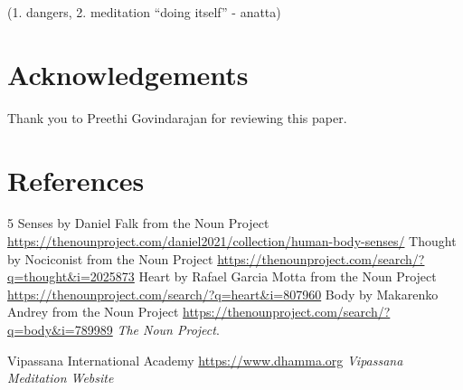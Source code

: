 \documentclass[a4paper, amsfonts, amssymb, amsmath, reprint, showkeys, nofootinbib, twoside]{revtex4-1}
\begin{document}
(1. dangers, 2. meditation ``doing itself'' - anatta)


\section*{Acknowledgements}

Thank you to Preethi Govindarajan for reviewing this paper.


\section*{References}

\begin{thebibliography}{99}

  5 Senses by Daniel Falk from the Noun Project
  \url{https://thenounproject.com/daniel2021/collection/human-body-senses/}
  Thought by Nociconist from the Noun Project
  \url{https://thenounproject.com/search/?q=thought&i=2025873}
  Heart by Rafael Garcia Motta from the Noun Project
  \url{https://thenounproject.com/search/?q=heart&i=807960}
  Body by Makarenko Andrey from the Noun Project
  \url{https://thenounproject.com/search/?q=body&i=789989}
  \textit{The Noun Project}.

  Vipassana International Academy
  \url{https://www.dhamma.org}
  \textit{Vipassana Meditation Website}


\end{thebibliography}
\end{document}
